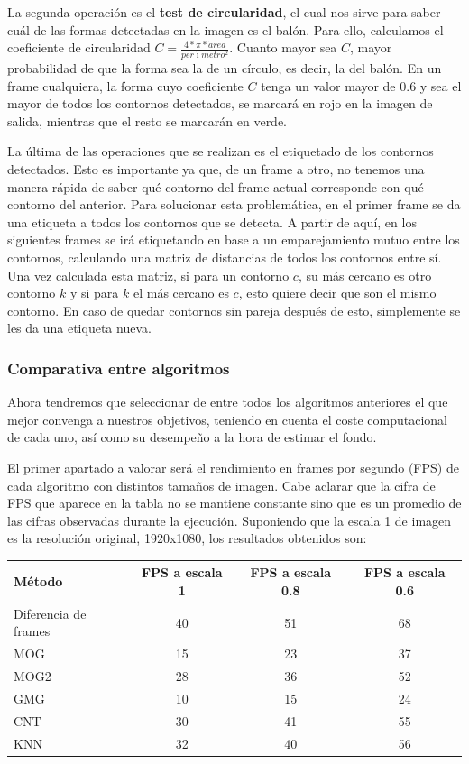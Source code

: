 La segunda operación es el \textbf{test de circularidad}, el cual nos sirve para saber cuál de las formas detectadas en la imagen es el balón. Para ello, calculamos el coeficiente de circularidad $C =  \frac{4*\pi*\acute{a}rea}{per\acute{\imath}metro^2}$. Cuanto mayor sea $C$, mayor probabilidad de que la forma sea la de un círculo, es decir, la del balón. En un frame cualquiera, la forma cuyo coeficiente $C$ tenga un valor mayor de 0.6 y sea el mayor de todos los contornos detectados, se marcará en rojo en la imagen de salida, mientras que el resto se marcarán en verde.

La última de las operaciones que se realizan es el etiquetado de los contornos detectados. Esto es importante ya que, de un frame a otro, no tenemos una manera rápida de saber qué contorno del frame actual corresponde con qué contorno del anterior. Para solucionar esta problemática, en el primer frame se da una etiqueta a todos los contornos que se detecta. A partir de aquí, en los siguientes frames se irá etiquetando en base a un emparejamiento mutuo entre los contornos, calculando una matriz de distancias de todos los contornos entre sí. Una vez calculada esta matriz, si para un contorno $c$, su más cercano es otro contorno $k$ y si para $k$ el más cercano es $c$, esto quiere decir que son el mismo contorno. En caso de quedar contornos sin pareja después de esto, simplemente se les da una etiqueta nueva.

\subsubsection*{Comparativa entre algoritmos}

Ahora tendremos que seleccionar de entre todos los algoritmos anteriores el que mejor convenga a nuestros objetivos, teniendo en cuenta el coste computacional de cada uno, así como su desempeño a la hora de estimar el fondo.

El primer apartado a valorar será el rendimiento en frames por segundo (FPS) de cada algoritmo con distintos tamaños de imagen. Cabe aclarar que la cifra de FPS que aparece en la tabla no se mantiene constante sino que es un promedio de las cifras observadas durante la ejecución. Suponiendo que la escala 1 de imagen es la resolución original, 1920x1080, los resultados obtenidos son:

\begin{center}
    \begin{tabular}{| l | c | c | c |}
    \hline
    \textbf{Método} & \textbf{FPS a escala 1} & \textbf{FPS a escala 0.8} & \textbf{FPS a escala 0.6}\\ \hline
    Diferencia de frames & 40 & 51 & 68 \\ \hline
    MOG & 15 & 23 & 37 \\ \hline
    MOG2 & 28 & 36 & 52 \\ \hline
    GMG & 10 & 15 & 24 \\ \hline
    CNT & 30 & 41 & 55\\ \hline
    KNN & 32 & 40 & 56\\ \hline
    
    \end{tabular}
\end{center}

